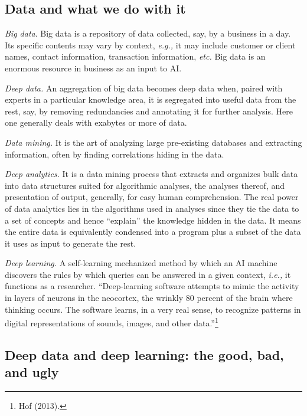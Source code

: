 \begin{multicols}{2}
\subsection{Data and what we do with it}

\textit{Big data}. Big data is a repository of data collected, say, by a business in a day. Its specific contents may vary by context, \textit{e.g.,} it may include customer or client names, contact information, transaction information, \textit{etc.} Big data is an enormous resource in business as an input to AI.

\textit{Deep data.} An aggregation of big data becomes deep data when, paired with experts in a particular knowledge area, it is segregated into useful data from the rest, say, by removing redundancies and annotating it for further analysis. Here one generally deals with exabytes or more of data. 

\textit{Data mining.} It is the art of analyzing large pre-existing databases and extracting information, often by finding correlations hiding in the data.

\textit{Deep analytics.} It is a data mining process that extracts and organizes bulk data into data structures suited for algorithmic analyses, the analyses thereof, and presentation of output, generally, for easy human comprehension. The real power of data analytics lies in the algorithms used in analyses since they tie the data to a set of concepts and hence “explain” the knowledge hidden in the data. It means
the entire data is equivalently condensed into a program plus a subset of the data it uses as input to generate the rest.

\textit{Deep learning.} A self-learning mechanized method by which an AI machine discovers the rules by which queries can be answered in a given context, \textit{i.e.,} it functions as a researcher. “Deep-learning software attempts to mimic the activity in layers of neurons in the neocortex, the wrinkly 80 percent of the brain where thinking occurs. The software learns, in a very real sense, to recognize patterns in digital representations of sounds, images, and other data.”\footnote{Hof (2013).}

\subsection{Deep data and deep learning: the good, bad, and ugly}


\end{multicols}
